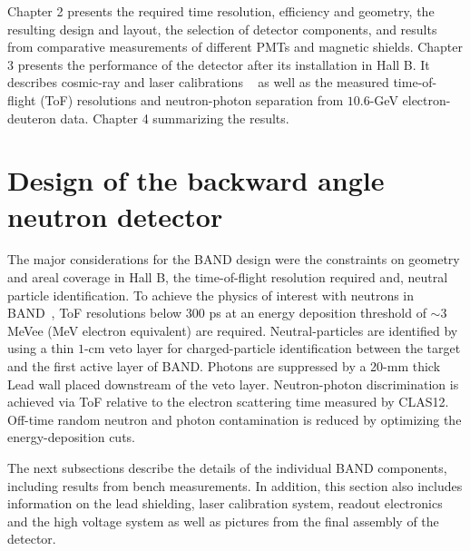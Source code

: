 \documentclass[3p,final,twocolumn]{elsarticle}
\begin{document}
Chapter 2 presents the required time resolution, efficiency and
geometry, the resulting design and layout, the selection of detector
components, and results from comparative measurements of different
PMTs and magnetic shields. Chapter 3 presents the performance of the
detector after its installation in Hall B. It describes cosmic-ray and
laser calibrations ~\cite{band-laser} as well as the measured
time-of-flight (ToF) resolutions and neutron-photon separation from
$10.6$-\si{\GeV} electron-deuteron data. Chapter 4 summarizing the
results.




\section{Design of the backward angle neutron detector}
The major considerations for the BAND design were the constraints on
geometry and areal coverage in Hall B, the time-of-flight resolution
required and, neutral particle identification.  To achieve the physics
of interest with neutrons in BAND~\cite{band-proposal}, ToF
resolutions below $300$ \si{\pico\second} at an energy deposition
threshold of $\sim 3$ MeVee (MeV electron equivalent) are required. Neutral-particles are
identified by using a thin $1$-\si{\centi\meter} veto layer for
charged-particle identification between the target and the first
active layer of BAND. Photons are suppressed by a 20-\si{\milli\meter}
thick Lead wall placed downstream of the veto layer. Neutron-photon
discrimination is achieved via ToF relative to the electron scattering
time measured by CLAS12. Off-time random neutron and photon
contamination is reduced by optimizing the energy-deposition cuts.

The next subsections describe the details of the individual BAND components,
including results from bench measurements. In addition,
this section also includes information on the lead shielding, laser
calibration system, readout electronics and the high voltage system as
well as pictures from the final assembly of the detector.
\end{document}
